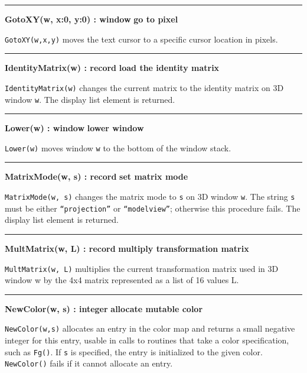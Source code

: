 \bigskip\hrule\vspace{0.1cm}
\noindent
{\bf GotoXY(w, x:0, y:0) : window } \hfill {\bf go to pixel}

\noindent
\texttt{GotoXY(w,x,y)} moves the text cursor to a specific cursor
location in pixels.

\bigskip\hrule\vspace{0.1cm}
\noindent
{\bf IdentityMatrix(w) : record } \hfill {\bf load the identity matrix}

\noindent
\texttt{IdentityMatrix(w)} changes the current matrix to the identity
matrix on 3D window \texttt{w}. The display list element is returned. 

\bigskip\hrule\vspace{0.1cm}
\noindent
{\bf Lower(w) : window } \hfill {\bf lower window}

\noindent
\texttt{Lower(w)} moves window \texttt{w} to the bottom of the window
stack.

\bigskip\hrule\vspace{0.1cm}
\noindent
{\bf MatrixMode(w, s) : record } \hfill {\bf set matrix mode}

\noindent
\texttt{MatrixMode(w, s)} changes the matrix mode to \texttt{s} on 3D
window \texttt{w}. The string \texttt{s} must be either
\texttt{{\textquotedblleft}projection{\textquotedblright}} or
\texttt{{\textquotedblleft}modelview{\textquotedblright}}; otherwise
this procedure fails. The display list element is returned.

\bigskip\hrule\vspace{0.1cm}
\noindent
{\bf MultMatrix(w, L) : record } \hfill {\bf multiply transformation matrix}

\noindent
\texttt{MultMatrix(w, L)} multiplies the current transformation matrix
used in 3D window w by the 4x4 matrix represented as a list of 16
values L.

\bigskip\hrule\vspace{0.1cm}
\noindent
{\bf NewColor(w, s) : integer } \hfill {\bf allocate mutable color}

\noindent
\texttt{NewColor(w,s)} allocates an entry in the color map and returns a
small negative integer for this entry, usable in calls to routines that
take a color specification, such as \texttt{Fg()}. If \texttt{s} is
specified, the entry is initialized to the given color.
\texttt{NewColor()} fails if it cannot allocate an entry.

